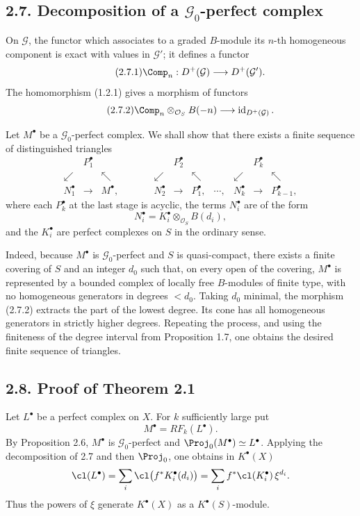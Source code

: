 \subsection*{2.7. Decomposition of a \(\mathcal G_0\)-perfect complex}
On \(\mathcal G\), the functor which associates to a graded \(B\)-module its \(n\)-th homogeneous component is exact with values in \(\mathcal G'\); it defines a functor
\begin{equation}\tag{2.7.1}
  \Comp_n:D^+(\mathcal G)\longrightarrow D^+(\mathcal G').
\end{equation}
The homomorphism (1.2.1) gives a morphism of functors
\begin{equation}\tag{2.7.2}
  \Comp_n\otimes_{\mathcal O_S}B(-n)\longrightarrow
  \operatorname{id}_{D^+(\mathcal G)}.
\end{equation}

Let \(M^\bullet\) be a \(\mathcal G_0\)-perfect complex. We shall show that there exists a finite sequence of distinguished triangles
\[
\begin{array}{ccccccccccc}
& P_1^\bullet &&&& P_2^\bullet &&&& P_k^\bullet &\\
\swarrow && \nwarrow && \swarrow && \nwarrow && \swarrow && \nwarrow\\
N_1^\bullet & \longrightarrow & M^\bullet, & \qquad &
N_2^\bullet & \longrightarrow & P_1^\bullet, & \cdots, &
N_k^\bullet & \longrightarrow & P_{k-1}^\bullet,
\end{array}
\]
where each \(P_k^\bullet\) at the last stage is acyclic, the terms \(N_i^\bullet\) are of the form
\[
  N_i^\bullet=K_i^\bullet\otimes_{\mathcal O_S}B(d_i),
\]
and the \(K_i^\bullet\) are perfect complexes on \(S\) in the ordinary sense.

Indeed, because \(M^\bullet\) is \(\mathcal G_0\)-perfect and \(S\) is quasi-compact, there exists a finite covering of \(S\) and an integer \(d_0\) such that, on every open of the covering, \(M^\bullet\) is represented by a bounded complex of locally free \(B\)-modules of finite type, with no homogeneous generators in degrees \(<d_0\). Taking \(d_0\) minimal, the morphism (2.7.2) extracts the part of the lowest degree. Its cone has all homogeneous generators in strictly higher degrees. Repeating the process, and using the finiteness of the degree interval from Proposition 1.7, one obtains the desired finite sequence of triangles.

\subsection*{2.8. Proof of Theorem 2.1}
Let \(L^\bullet\) be a perfect complex on \(X\). For \(k\) sufficiently large put
\[
  M^\bullet=RF_k(L^\bullet).
\]
By Proposition 2.6, \(M^\bullet\) is \(\mathcal G_0\)-perfect and \(\Proj_0(M^\bullet)\simeq L^\bullet\). Applying the decomposition of 2.7 and then \(\Proj_0\), one obtains in \(K^\bullet(X)\)
\[
  \cl(L^\bullet)
  =
  \sum_i \cl\bigl(f^*K_i^\bullet(d_i)\bigr)
  =
  \sum_i f^*\cl(K_i^\bullet)\,\xi^{d_i}.
\]
Thus the powers of \(\xi\) generate \(K^\bullet(X)\) as a \(K^\bullet(S)\)-module.

